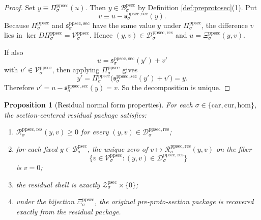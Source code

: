 \documentclass[11pt]{article}
\newcommand{\Car}{\mathrm{car}}
\newcommand{\Cur}{\mathrm{cur}}
\newcommand{\Hom}{\mathrm{hom}}
\newcommand{\ProtoSectionBody}[1]{\mathcal B_{#1}^{\mathrm{psec}}}
\newcommand{\ProtoSectionShell}[1]{\mathcal Z_{#1}^{\mathrm{psec}}}
\newcommand{\PreProtoSectionProj}[1]{\Pi_{#1}^{\mathrm{ppsec}}}
\newcommand{\PreProtoSectionMinSection}[1]{\mathfrak s_{#1}^{\mathrm{ppsec,sec}}}
\newcommand{\PreProtoSectionVertical}[1]{\mathcal V_{#1}^{\mathrm{ppsec}}}
\newcommand{\PreProtoSectionResidualBody}[1]{\mathcal D_{#1}^{\mathrm{ppsec,res}}}
\newcommand{\PreProtoSectionResidualFunctional}[1]{\mathscr R_{#1}^{\mathrm{ppsec,res}}}
\newcommand{\PreProtoSectionNormalizer}[1]{\Xi_{#1}^{\mathrm{ppsec}}}
\newtheorem{proposition}{Proposition}
\begin{document}
\begin{proof}
Set \(y\equiv\PreProtoSectionProj{\sigma}(u)\). Then \(y\in\ProtoSectionBody{\sigma}\) by Definition \ref{def:preprotosec}(1). Put
\[
v\equiv u-\PreProtoSectionMinSection{\sigma}(y).
\]
Because \(\PreProtoSectionProj{\sigma}\) and \(\PreProtoSectionMinSection{\sigma}\) have the same value \(y\) under \(\PreProtoSectionProj{\sigma}\), the difference \(v\) lies in \(\ker D\PreProtoSectionProj{\sigma}=\PreProtoSectionVertical{\sigma}\). Hence \((y,v)\in\PreProtoSectionResidualBody{\sigma}\) and \(u=\PreProtoSectionNormalizer{\sigma}(y,v)\).

If also
\[
u=\PreProtoSectionMinSection{\sigma}(y')+v'
\]
with \(v'\in\PreProtoSectionVertical{\sigma}\), then applying \(\PreProtoSectionProj{\sigma}\) gives
\[
y'
=
\PreProtoSectionProj{\sigma}\bigl(\PreProtoSectionMinSection{\sigma}(y')+v'\bigr)
=
y.
\]
Therefore \(v'=u-\PreProtoSectionMinSection{\sigma}(y)=v\). So the decomposition is unique.
\end{proof}

\begin{proposition}[Residual normal form properties]
\label{prop:residualprops}
For each \(\sigma\in\{\Car,\Cur,\Hom\}\), the section-centered residual package satisfies:
\begin{enumerate}
    \item \(\PreProtoSectionResidualFunctional{\sigma}(y,v)\ge 0\) for every \((y,v)\in\PreProtoSectionResidualBody{\sigma}\);
    \item for each fixed \(y\in\ProtoSectionBody{\sigma}\), the unique zero of \(v\mapsto \PreProtoSectionResidualFunctional{\sigma}(y,v)\) on the fiber
    \[
    \{v\in\PreProtoSectionVertical{\sigma}:(y,v)\in\PreProtoSectionResidualBody{\sigma}\}
    \]
    is \(v=0\);
    \item the residual shell is exactly \(\ProtoSectionShell{\sigma}\times\{0\}\);
    \item under the bijection \(\PreProtoSectionNormalizer{\sigma}\), the original pre-proto-section package is recovered exactly from the residual package.
\end{enumerate}
\end{proposition}
\end{document}
